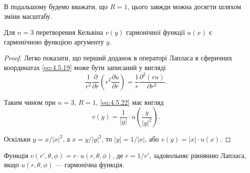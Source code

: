 \begin{remark}
	В подальшому будемо вважати, що $R = 1$, цього завжди можна досягти шляхом зміни масштабу. 
\end{remark}

\begin{proposition}
	Для $n = 3$ перетворення Кельвіна $v(y)$ гармонічної функції $u(x)$ є гармонічною функцією аргументу $y$. 
\end{proposition}

\begin{proof}
	Легко показати, що перший доданок в операторі Лапласа в сферичних координатах \eqref{eq:4.5.19} може бути записаний у вигляді 
	\begin{equation}
		\frac{1}{r^2} \frac{\partial}{\partial r} \left( r^2 \frac{\partial u}{\partial r} \right) = \frac{1}{r} \frac{\partial^2 (ru)}{\partial r^2}.
	\end{equation}
	
	Таким чином при $n = 3$, $R = 1$, \eqref{eq:4.5.22} має вигляд
	\begin{equation}
		v(y) = \frac{1}{|y|} \cdot u \left( \frac{y}{|y|^2} \right).
	\end{equation}
	
	Оскільки $y = x / |x|^2$, а $x = y / |y|^2$, то $|y| = 1 / |x|$, або $v(y) = |x| \cdot u(x)$.
\end{proof}

\begin{proposition}
	Функція $v(r', \theta, \phi) = r \cdot u(r, \theta, \phi)$, де $r = 1 / r'$, задовольняє рівнянню Лапласа, якщо $u(r, \theta, \phi)$ --- гармонічна функція.
\end{proposition}

